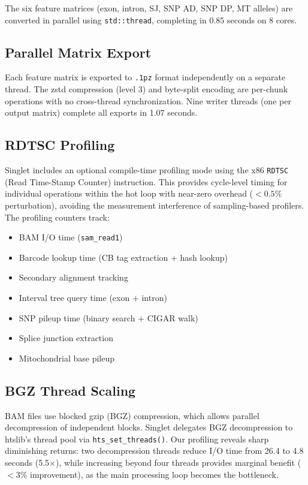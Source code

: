 \documentclass[11pt,a4paper]{article}
\begin{document}
The six feature matrices (exon, intron, SJ, SNP AD, SNP DP, MT alleles) are converted in parallel using \texttt{std::thread}, completing in 0.85 seconds on 8 cores.

\subsection{Parallel Matrix Export}

Each feature matrix is exported to \texttt{.1pz} format independently on a separate thread. The zstd compression (level 3) and byte-split encoding are per-chunk operations with no cross-thread synchronization. Nine writer threads (one per output matrix) complete all exports in 1.07 seconds.

\subsection{RDTSC Profiling}

Singlet includes an optional compile-time profiling mode using the x86 \texttt{RDTSC} (Read Time-Stamp Counter) instruction. This provides cycle-level timing for individual operations within the hot loop with near-zero overhead ($<0.5\%$ perturbation), avoiding the measurement interference of sampling-based profilers. The profiling counters track:

\begin{itemize}
    \item BAM I/O time (\texttt{sam\_read1})
    \item Barcode lookup time (CB tag extraction + hash lookup)
    \item Secondary alignment tracking
    \item Interval tree query time (exon + intron)
    \item SNP pileup time (binary search + CIGAR walk)
    \item Splice junction extraction
    \item Mitochondrial base pileup
\end{itemize}

\subsection{BGZ Thread Scaling}

BAM files use blocked gzip (BGZ) compression, which allows parallel decompression of independent blocks. Singlet delegates BGZ decompression to htslib's thread pool via \texttt{hts\_set\_threads()}. Our profiling reveals sharp diminishing returns: two decompression threads reduce I/O time from 26.4 to 4.8 seconds (5.5$\times$), while increasing beyond four threads provides marginal benefit ($<3\%$ improvement), as the main processing loop becomes the bottleneck.
\end{document}
